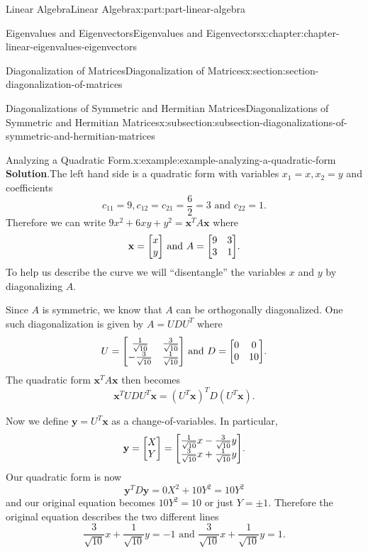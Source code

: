 \documentclass[twoside,10pt,]{book}
\newcommand{\blocktitlefont}{\relax}
\numberwithin{equation}{part}
\newcommand{\xx}{\mathbf{x}}
\newcommand{\yy}{\mathbf{y}}
\begin{document}
\begin{partptx}{Linear Algebra}{}{Linear Algebra}{}{}{x:part:part-linear-algebra}
\begin{chapterptx}{Eigenvalues and Eigenvectors}{}{Eigenvalues and Eigenvectors}{}{}{x:chapter:chapter-linear-eigenvalues-eigenvectors}
\begin{sectionptx}{Diagonalization of Matrices}{}{Diagonalization of Matrices}{}{}{x:section:section-diagonalization-of-matrices}
\begin{subsectionptx}{Diagonalizations of Symmetric and Hermitian Matrices}{}{Diagonalizations of Symmetric and Hermitian Matrices}{}{}{x:subsection:subsection-diagonalizations-of-symmetric-and-hermitian-matrices}
\begin{example}{Analyzing a Quadratic Form.}{x:example:example-analyzing-a-quadratic-form}
\noindent\textbf{\blocktitlefont Solution}.\hypertarget{g:solution:idm1630506168}{}\quad{}The left hand side is a quadratic form with variables \(x_1 = x,x_2 = y\) and coefficients%
\begin{equation*}
c_{11} = 9, c_{12} = c_{21} = \frac{6}{2}=3\text{ and }c_{22} = 1\text{.}
\end{equation*}
Therefore we can write \(9x^2 + 6xy + y^2 = \xx^T A\xx\) where%
\begin{equation*}
\xx = \mqty[x\\y]\text{ and }A = \mqty[9 & 3 \\ 3 & 1]\text{.}
\end{equation*}
To help us describe the curve we will ``disentangle'' the variables \(x\) and \(y\) by diagonalizing \(A\).%
\par
Since \(A\) is symmetric, we know that \(A\) can be orthogonally diagonalized. One such diagonalization is given by \(A = UDU^T\) where%
\begin{equation*}
U = \mqty[\frac{1}{\sqrt{10}} & \frac{3}{\sqrt{10}} \\ -\frac{3}{\sqrt{10}} & \frac{1}{\sqrt{10}}]\text{ and } D = \mqty[0 & 0 \\ 0 & 10]\text{.}
\end{equation*}
The quadratic form \(\xx^T A\xx\) then becomes%
\begin{equation*}
\xx^T UDU^T\xx = (U^T\xx)^T D (U^T \xx)\text{.}
\end{equation*}
%
\par
Now we define \(\yy = U^T\xx\) as a change-of-variables. In particular,%
\begin{equation*}
\yy = \mqty[X\\Y] = \mqty[\frac{1}{\sqrt{10}}x - \frac{3}{\sqrt{10}}y \\ \frac{3}{\sqrt{10}}x + \frac{1}{\sqrt{10}}y]\text{.}
\end{equation*}
Our quadratic form is now%
\begin{equation*}
\yy^T D\yy = 0X^2 + 10Y^2 = 10Y^2
\end{equation*}
and our original equation becomes \(10Y^2 = 10\) or just \(Y = \pm1\). Therefore the original equation describes the two different lines%
\begin{equation*}
\frac{3}{\sqrt{10}}x + \frac{1}{\sqrt{10}}y = -1\text{ and }\frac{3}{\sqrt{10}}x + \frac{1}{\sqrt{10}}y = 1\text{.}
\end{equation*}
%
\end{example}
\end{subsectionptx}

\end{sectionptx}
\end{chapterptx}
\end{partptx}
\end{document}
